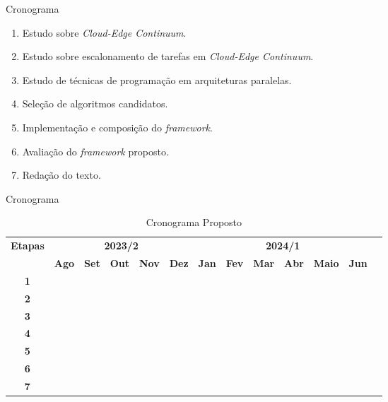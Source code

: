\begin{frame}{Cronograma}
    \begin{enumerate}
        \item Estudo sobre \textit{Cloud-Edge Continuum}.
        \item Estudo sobre escalonamento de tarefas em \textit{Cloud-Edge Continuum}.
        \item Estudo de técnicas de programação em arquiteturas paralelas.
        \item Seleção de algoritmos candidatos.
        \item Implementação e composição do \textit{framework}.
        \item Avaliação do \textit{framework} proposto.
        \item Redação do texto.
    \end{enumerate}
\end{frame}

\begin{frame}{Cronograma}
    \begin{table}[htpd]
        \tiny
        \centering
        \noindent \begin{tabular}{|c|c|c|c|c|c|c|c|c|c|c|c|c|}
            \hline
            \multirow{2}{*}{\textbf{\small{Etapas}}} & \multicolumn{5}{|c|}{\textbf{\small{2023/2}}} &
            \multicolumn{6}{|c|}{\textbf{\small{2024/1}}} \\
            \cline{2-12}
            &\textbf{Ago} & \textbf{Set} & \textbf{Out} & \textbf{Nov} & \textbf{Dez} & \textbf{Jan} & 
            \textbf{Fev} & \textbf{Mar} & \textbf{Abr} & \textbf{Maio} & \textbf{Jun} \\
            \hline
            \textbf{\small{1}}  & \cellcolor{gray} & \cellcolor{gray} &  &   &   &   &   &   &   &   &   \\
            \hline
            \textbf{\small{2}}  &   & \cellcolor{gray} & \cellcolor{gray} &   &   &   &   &   &   &   &   \\
            \hline
            \textbf{\small{3}}  &   & \cellcolor{gray} & \cellcolor{gray} &   &   &   &   &   &   &   &   \\
            \hline
            \textbf{\small{4}}  &   &   & \cellcolor{gray} & \cellcolor{gray} & \cellcolor{gray} &  &  &  &  &  &   \\
            \hline
            \textbf{\small{5}}  &   &   &   &   & \cellcolor{gray} & \cellcolor{gray} & \cellcolor{gray} & \cellcolor{gray} &  &  &  \\
            \hline
            \textbf{\small{6}}  &   &   &   &   &   &   & \cellcolor{gray} & \cellcolor{gray} & \cellcolor{gray} &   &   \\
            \hline
            \textbf{\small{7}}  & \cellcolor{gray} & \cellcolor{gray} & \cellcolor{gray} & \cellcolor{gray} & \cellcolor{gray} & \cellcolor{gray} & \cellcolor{gray} & \cellcolor{gray} & \cellcolor{gray} & \cellcolor{gray} & \cellcolor{gray} \\
            \hline
        \end{tabular} 
        \label{tab:Cronograma}
        \caption{Cronograma Proposto}
    \end{table}
\end{frame}